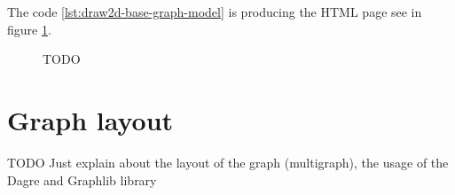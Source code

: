 The code \ref{lst:draw2d-base-graph-model} is producing the HTML page see in figure \ref{fig:base-graph-model-html-draw2d}.

\begin{figure}[h]%
    \centering
    \caption[TODO]{TODO}
    \label{fig:base-graph-model-html-draw2d}
\end{figure}%



\section{Graph layout} %
\label{sec:graph-layout}

TODO Just explain about the layout of the graph (multigraph), the usage of the Dagre and Graphlib library



